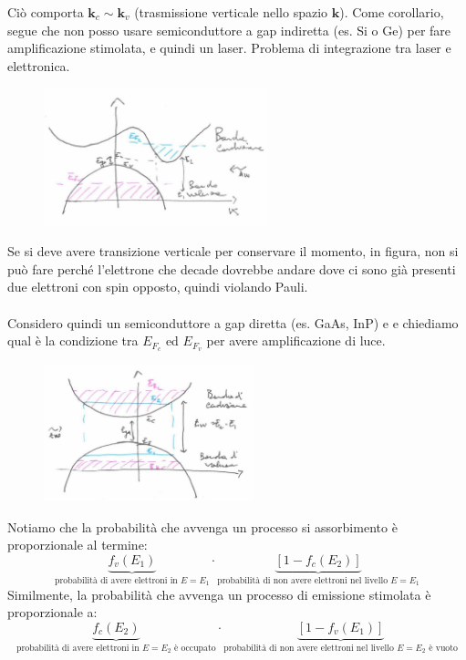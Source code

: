 \documentclass{book}
\def \*#1{\mathbf{#1}}
\theoremstyle{remark}
\begin{document}
Ciò comporta $\*k_c \sim \*k_v$ (trasmissione verticale nello spazio $\*k$).
Come corollario, segue che non posso usare semiconduttore a gap indiretta (es. Si o Ge) per fare amplificazione stimolata, e quindi un laser. Problema di integrazione tra laser e elettronica.
\begin{figure}[H]
\centering
\includegraphics[height=4cm]{images/laser_80_5}
\end{figure}
\noindent
Se si deve avere transizione verticale per conservare il momento, in figura, non si può fare perché l'elettrone che decade dovrebbe andare dove ci sono già presenti due elettroni con spin opposto, quindi violando Pauli.\\
\\
Considero quindi un semiconduttore a gap diretta (es. GaAs, InP) e e chiediamo qual è la condizione tra $E_{F_c}$ ed $E_{F_v}$ per avere amplificazione di luce.
\begin{figure}[H]
\centering
\includegraphics[height=4cm]{images/laser_80_6}
\end{figure}
\noindent
Notiamo che la probabilità che avvenga un processo si assorbimento è proporzionale al termine:
\begin{equation*}
\underbrace{f_v(E_1)}_\text{probabilità di avere elettroni in $E=E_1$} \cdot \underbrace{[1 - f_c(E_2)]}_\text{probabilità di non avere elettroni nel livello $E=E_1$}
\end{equation*}
Similmente, la probabilità che avvenga un processo di emissione stimolata è proporzionale a:
\begin{equation*}
\underbrace{f_c(E_2)}_\text{probabilità di avere elettroni in $E=E_2$ è occupato} \cdot \underbrace{[1 - f_v(E_1)]}_\text{probabilità di non avere elettroni nel livello $E=E_2$ è vuoto}
\end{equation*}
\end{document}
